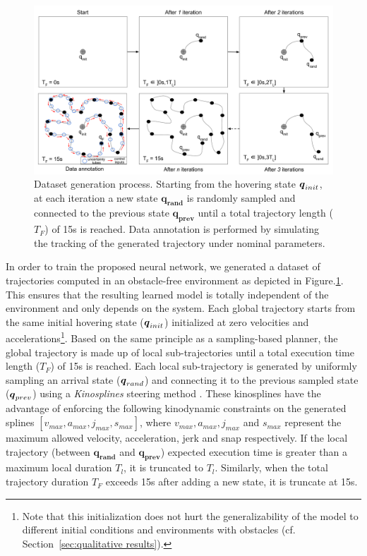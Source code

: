 \begin{figure} [t]
    \centering
    \includegraphics[width=0.9\linewidth]{figures/learning_quadrotor/dataset_generation.png}%
    \caption{Dataset generation process. 
    Starting from the hovering state $\boldsymbol{q}_{init}$, at each iteration a new state $\boldsymbol{q_{rand}}$ is randomly sampled and connected to the previous state $\boldsymbol{q_{prev}}$ until a total trajectory length ($T_F$) of 15s is reached.
    Data annotation is performed by simulating the tracking of the generated trajectory under nominal parameters.
    }%
    \label{fig: data_generation}%
\end{figure}

In order to train the proposed neural network, we generated a dataset of trajectories computed in an obstacle-free environment 
as depicted in Figure.\ref{fig: data_generation}.
This ensures that the resulting learned model is totally independent of the environment and only depends on the system.
Each global trajectory starts from the same initial hovering state ($\boldsymbol{q}_{init}$) initialized at zero velocities and accelerations\footnote{Note that this initialization does not hurt the generalizability of the model to different initial conditions and environments with obstacles (cf. Section~\ref{sec:qualitative results}).}.
Based on the same principle as a sampling-based planner, the global trajectory is made up of local sub-trajectories until a total execution time length ($T_F$) of 15s is reached.
Each local sub-trajectory is generated by uniformly sampling an arrival state ($\boldsymbol{q}_{rand}$) and connecting it to the previous sampled state ($\boldsymbol{q}_{prev}$) using a \emph{Kinosplines} steering method \cite{cKino}.
These kinosplines have the advantage of enforcing the following kinodynamic constraints on the generated splines $[v_{max}, a_{max}, j_{max}, s_{max}]$, where $v_{max},a_{max},j_{max}$ and $s_{max}$ represent the maximum allowed velocity, acceleration, jerk and snap respectively.
If the local trajectory (between $\boldsymbol{q_{rand}}$ and $\boldsymbol{q_{prev}}$) expected execution time is greater than a maximum local duration $T_l$, it is truncated to $T_l$. Similarly, when the total trajectory duration $T_F$ exceeds 15s after adding a new state, it is truncate at 15s.

